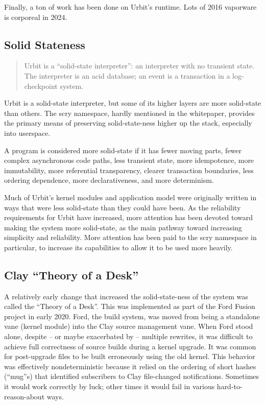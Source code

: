 \documentclass[twoside]{article}
\begin{document}
Finally, a ton of work has been done on Urbit's runtime.  Lots of 2016 vaporware is corporeal in 2024.

\subsection{Solid Stateness}

\begin{quote}
Urbit is a ``solid-state interpreter'': an interpreter with no
transient state.  The interpreter is an {\sc acid} database; an event
is a transaction in a log-checkpoint system.  \citep{Whitepaper}
\end{quote}

Urbit is a solid-state interpreter, but some of its higher layers are more solid-state than others.  The scry namespace, hardly mentioned in the whitepaper, provides the primary means of preserving solid-state-ness higher up the stack, especially into userspace.

A program is considered more solid-state if it has fewer moving parts, fewer complex asynchronous code paths, less transient state, more idempotence, more immutability, more referential transparency, clearer transaction boundaries, less ordering dependence, more declarativeness, and more determinism.

Much of Urbit's kernel modules and application model were originally written in ways that were less solid-state than they could have been.  As the reliability requirements for Urbit have increased, more attention has been devoted toward making the system more solid-state, as the main pathway toward increasing simplicity and reliability.  More attention has been paid to the scry namespace in particular, to increase its capabilities to allow it to be used more heavily.

\subsection{Clay ``Theory of a Desk''}

A relatively early change that increased the solid-state-ness of the system was called the ``Theory of a Desk''.  This was implemented as part of the Ford Fusion project in early 2020.  Ford, the build system, was moved from being a standalone vane (kernel module) into the Clay source management vane.  When Ford stood alone, despite – or maybe exacerbated by – multiple rewrites, it was difficult to achieve full correctness of source builds during a kernel upgrade.  It was common for post-upgrade files to be built erroneously using the old kernel.  This behavior was effectively nondeterministic because it relied on the ordering of short hashes (``mug''s) that identified subscribers to Clay file-changed notifications.  Sometimes it would work correctly by luck; other times it would fail in various hard-to-reason-about ways.
\end{document}
